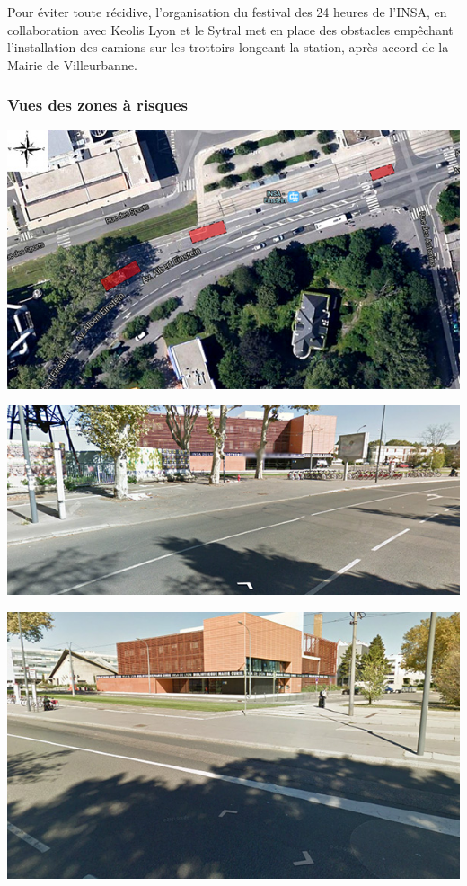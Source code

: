 \documentclass[hidelinks, paper=a4, fontsize=13pt]{report}
\begin{document}
Pour éviter toute récidive, l’organisation du festival des 24 heures de l’INSA, en collaboration avec Keolis Lyon et le Sytral met en place des obstacles empêchant l’installation des camions sur les trottoirs longeant la station, après accord de la Mairie de Villeurbanne. 

\subsubsection{Vues des zones à risques}
\begin{center}
	\includegraphics[scale=0.8]{Annexes/Images/zoneARisque}
\end{center}
\begin{center}
	\includegraphics[scale=0.8]{Annexes/Images/zoneARisque2}
\end{center}
\begin{center}
	\includegraphics[scale=0.7]{Annexes/Images/zoneARisque3}
\end{center}
\end{document}
